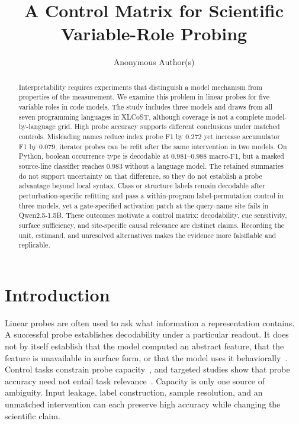 \documentclass{article}
\title{A Control Matrix for Scientific Variable-Role Probing}
\author{Anonymous Author(s)}
\begin{document}
\maketitle

\begin{abstract}
Interpretability requires experiments that distinguish a model mechanism from
properties of the measurement. We examine this problem in linear probes for
five variable roles in code models. The study includes three models and draws
from all seven programming languages in XLCoST, although coverage is not a
complete model-by-language grid. High probe accuracy supports different
conclusions under matched controls. Misleading names reduce index probe F1 by
$0.272$ yet increase accumulator F1 by $0.079$; iterator probes can be refit
after the same intervention in two models. On Python, boolean occurrence type
is decodable at $0.981$--$0.988$ macro-F1, but a masked source-line classifier
reaches $0.983$ without a language model. The retained summaries do not support
uncertainty on that difference, so they do not establish a probe advantage
beyond local syntax. Class or structure labels remain decodable after
perturbation-specific refitting and pass a within-program label-permutation
control in three models, yet a gate-specified activation patch at the
query-name site fails in Qwen2.5-1.5B. These outcomes motivate a control matrix:
decodability, cue sensitivity, surface sufficiency, and site-specific causal
relevance are distinct claims. Recording the unit, estimand, and unresolved
alternatives makes the evidence more falsifiable and replicable.
\end{abstract}

\section{Introduction}

Linear probes are often used to ask what information a representation contains.
A successful probe establishes decodability under a particular readout. It
does not by itself establish that the model computed an abstract feature, that
the feature is unavailable in surface form, or that the model uses it
behaviorally~\citep{belinkov2022probing,voita2020mdl}. Control tasks constrain
probe capacity~\citep{hewitt2019control}, and targeted studies show that probe
accuracy need not entail task relevance~\citep{ravichander2021probing,
elazar2021amnesic}. Capacity is only one source of
ambiguity. Input leakage, label construction, sample resolution, and an
unmatched intervention can each preserve high accuracy while changing the
scientific claim.
\end{document}
